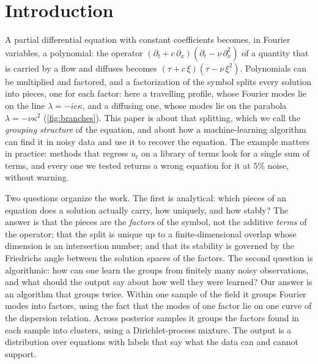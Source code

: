 \section{Introduction}\label{sec:intro}
A partial differential equation with constant coefficients becomes, in Fourier variables, a polynomial: the operator
$(\partial_t+c\,\partial_x)(\partial_t-\nu\,\partial_x^2)$ of a quantity that is carried by a flow and diffuses becomes
$(\tau+c\,\xi)(\tau-\nu\,\xi^2)$. Polynomials can be multiplied and factored, and a factorization of the symbol splits
every solution into pieces, one for each factor: here a travelling profile, whose Fourier modes lie on the line
$\lambda=-ic\kappa$, and a diffusing one, whose modes lie on the parabola $\lambda=-\nu\kappa^2$ (\cref{fig:branches}).
This paper is about that splitting, which we call the \emph{grouping structure} of the equation, and about how a
machine-learning algorithm can find it in noisy data and use it to recover the equation. The example matters in
practice: methods that regress $u_t$ on a library of terms look for a single sum of terms, and every one we tested
returns a wrong equation for it at $5\%$ noise, without warning.



Two questions organize the work. The first is analytical: which pieces of an equation does a solution actually carry,
how uniquely, and how stably? The answer is that the pieces are the \emph{factors} of the symbol, not the additive
\emph{terms} of the operator; that the split is unique up to a finite-dimensional overlap whose dimension is an
intersection number; and that its stability is governed by the Friedrichs angle between the solution spaces of the
factors. The second question is algorithmic: how can one learn the groups from finitely many noisy observations, and
what should the output say about how well they were learned? Our answer is an algorithm that groups twice. Within one
sample of the field it groups Fourier modes into factors, using the fact that the modes of one factor lie on one curve
of the dispersion relation. Across posterior samples it groups the factors found in each sample into clusters, using a
Dirichlet-process mixture. The output is a distribution over equations with labels that say what the data can and
cannot support.

